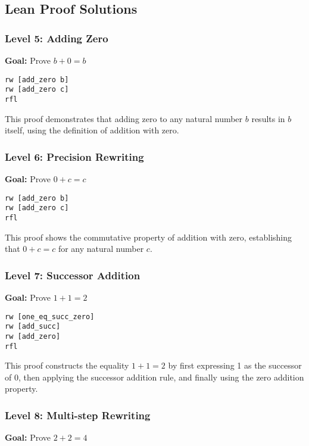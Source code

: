 \documentclass{article}
\theoremstyle{plain}
\theoremstyle{definition}
\theoremstyle{remark}
\begin{document}
\subsection{Lean Proof Solutions}

\subsubsection{Level 5: Adding Zero}

\textbf{Goal:} Prove $b + 0 = b$

\begin{verbatim}
rw [add_zero b]
rw [add_zero c]
rfl
\end{verbatim}

This proof demonstrates that adding zero to any natural number $b$ results in $b$ itself, using the definition of addition with zero.

\subsubsection{Level 6: Precision Rewriting}

\textbf{Goal:} Prove $0 + c = c$

\begin{verbatim}
rw [add_zero b]
rw [add_zero c]
rfl
\end{verbatim}

This proof shows the commutative property of addition with zero, establishing that $0 + c = c$ for any natural number $c$.

\subsubsection{Level 7: Successor Addition}

\textbf{Goal:} Prove $1 + 1 = 2$

\begin{verbatim}
rw [one_eq_succ_zero]
rw [add_succ]
rw [add_zero]
rfl
\end{verbatim}

This proof constructs the equality $1 + 1 = 2$ by first expressing 1 as the successor of 0, then applying the successor addition rule, and finally using the zero addition property.

\subsubsection{Level 8: Multi-step Rewriting}

\textbf{Goal:} Prove $2 + 2 = 4$
\end{document}
